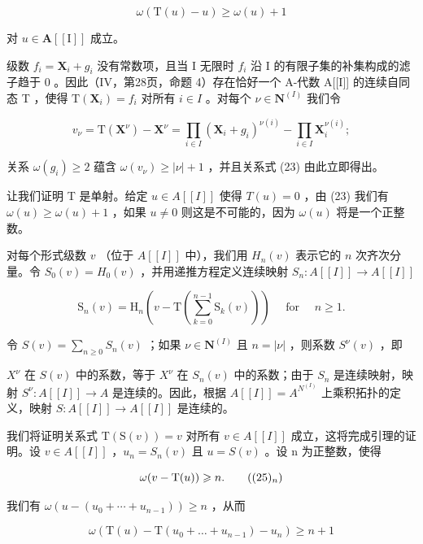 \[
\omega (\mathrm{T} (u) - u) \geqslant \omega (u) + 1\tag{23}
\]

对 \(u \in \mathbf{A}[[\mathrm{I}]]\) 成立。

级数 \(f_{i} = \mathbf{X}_{i} + g_{i}\) 没有常数项，且当 I 无限时 \(f_{i}\) 沿 I 的有限子集的补集构成的滤子趋于 0 。因此（IV，第28页，命题 4）存在恰好一个 A-代数 A{[}{[}I{]}{]} 的连续自同态 T ，使得 \(\mathrm{T}(\mathbf{X}_i) = f_i\) 对所有 \(i \in I\) 。对每个 \(\nu \in \mathbf{N}^{(I)}\) 我们令

\[
v _ {\nu} = \mathrm{T} \left(\mathbf {X} ^ {\nu}\right) - \mathbf {X} ^ {\nu} = \prod_ {i \in I} \left(\mathbf {X} _ {i} + g _ {i}\right) ^ {\nu (i)} - \prod_ {i \in I} \mathbf {X} _ {i} ^ {\nu (i)};
\]

关系 \(\omega(g_i) \geqslant 2\) 蕴含 \(\omega(v_\nu) \geqslant |\nu| + 1\) ，并且关系式 (23) 由此立即得出。

让我们证明 T 是单射。给定 \(u \in A[[I]]\) 使得 \(T(u) = 0\) ，由 (23) 我们有 \(\omega(u) \geqslant \omega(u) + 1\) ，如果 \(u \neq 0\) 则这是不可能的，因为 \(\omega(u)\) 将是一个正整数。

对每个形式级数 \(v\) （位于 \(A[[I]]\) 中），我们用 \(H_n(v)\) 表示它的 \(n\) 次齐次分量。令 \(S_0(v) = H_0(v)\) ，并用递推方程定义连续映射 \(S_n: A[[I]] \to A[[I]]\)

\[
\mathrm{S} _ {n} (v) = \mathrm{H} _ {n} \left(v - \mathrm{T} \left(\sum_ {k = 0} ^ {n - 1} \mathrm{S} _ {k} (v)\right)\right) \quad \text { for } \quad n \geqslant 1.\tag{24}
\]

令 \(S(v) = \sum_{n \geqslant 0} S_n(v)\) ；如果 \(\nu \in \mathbf{N}^{(I)}\) 且 \(n = |\nu|\) ，则系数 \(S^{\nu}(v)\) ，即

\(X^{\nu}\) 在 \(S(v)\) 中的系数，等于 \(X^{\nu}\) 在 \(S_{n}(v)\) 中的系数；由于 \(S_{n}\) 是连续映射，映射 \(S^{\nu}: A[[I]] \to A\) 是连续的。因此，根据 \(A[[I]] = A^{N^{(I)}}\) 上乘积拓扑的定义，映射 \(S: A[[I]] \to A[[I]]\) 是连续的。

我们将证明关系式 \(\mathrm{T}(\mathrm{S}(v)) = v\) 对所有 \(v \in A[[I]]\) 成立，这将完成引理的证明。设 \(v \in A[[I]]\) ，\(u_n = S_n(v)\) 且 \(u = S(v)\) 。设 n 为正整数，使得

\[
\omega (v - \mathrm{T} (u)) \geqslant n.\tag{$(25)_{n}$}
\]

我们有 \(\omega(u - (u_{0} + \cdots + u_{n-1})) \geqslant n\) ，从而

\[
\omega (\mathrm{T} (u) - \mathrm{T} (u _ {0} + \dots + u _ {n - 1}) - u _ {n}) \geqslant n + 1\tag{26}
\]

